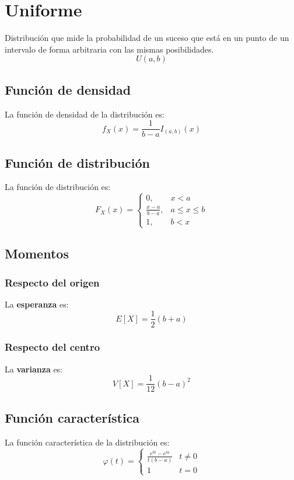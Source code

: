 \section{Uniforme}
\label{sec:uniforme}
Distribución que mide la probabilidad de un suceso que está en un punto de un
intervalo de forma arbitraria con las mismas posibilidades.
\[
\boxed{U\left( a, b \right)}
\]

\subsection{Función de densidad}
La función de densidad de la distribución es:
\[
f_X \left( x \right) = \frac{1}{b-a} I_{\left( a, b \right)}\left( x \right)
\]

\subsection{Función de distribución}
La función de distribución es:
\[
F_X\left( x \right) = \begin{cases}
    0, &x < a\\ 
    \frac{x-a}{b-a}, & a \le x \le b\\ 
    1, & b < x
\end{cases}
\]

\subsection{Momentos}

\subsubsection*{Respecto del origen}
La \textbf{esperanza} es: 
\[
    E\left[ X \right] = \frac{1}{2} \left( b+a \right)
\]
\subsubsection*{Respecto del centro}
La \textbf{varianza} es:
\[
    V\left[ X \right] = \frac{1}{12}\left( b - a \right)^2
\]

\subsection{Función característica}
La función característica de la distribución es:
\[
\varphi\left( t \right) = \begin{cases}
    \frac{e^{tb} - e^{ta}}{t\left( b - a \right)}&t \neq 0\\
    1 &t = 0
\end{cases} 
\]

